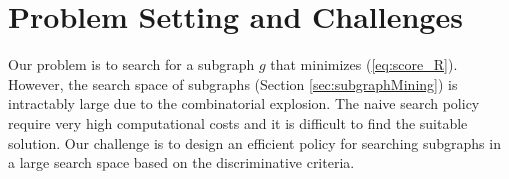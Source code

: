 \section{Problem Setting and Challenges}
Our problem is to search for a subgraph $g$
that minimizes (\ref{eq:score_R}).
However, the search space of subgraphs (Section \ref{sec:subgraphMining}) is intractably large
due to the combinatorial explosion.
The naive search policy require very high computational costs 
and it is difficult to find the suitable solution.
Our challenge is to design an efficient policy for searching subgraphs in a large search space
based on the discriminative criteria.

